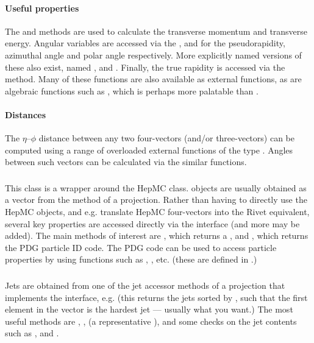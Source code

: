 \documentclass{JHEP3}
\begin{document}
\paragraph{Useful properties}%
The  and  methods are used to calculate the transverse
momentum and transverse energy. Angular variables are accessed via the
,  and  for the pseudorapidity, azimuthal
angle and polar angle respectively. More explicitly named versions of these also
exist, named ,  and
. Finally, the true rapidity is accessed via the
 method. Many of these functions are also available as external
functions, as are algebraic functions such as , which
is perhaps more palatable than .

\paragraph{Distances}%
The $\eta$--$\phi$ distance between any two four-vectors (and/or three-vectors)
can be computed using a range of overloaded external functions of the type
. Angles between such vectors can be calculated via the
similar  functions.

\subsubsection{}
This class is a wrapper around the HepMC 
class.  objects are usually obtained as a vector from the
 method of a  projection.  Rather than having
to directly use the HepMC objects, and e.g. translate HepMC four-vectors into
the Rivet equivalent, several key properties are accessed directly via the
 interface (and more may be added). The main methods of interest
are , which returns a , and ,
which returns the PDG particle ID code. The PDG code can be used to access
particle properties by using functions such as ,
, etc. (these are defined in
.)

\subsubsection{}
Jets are obtained from one of the jet accessor methods of a projection that
implements the  interface, e.g.  (this
returns the jets sorted by \pT, such that the first element in the vector is the
hardest jet --- usually what you want.) The most useful methods are
, ,  (a representative
), and some checks on the jet contents such as
,  and
.
\end{document}
